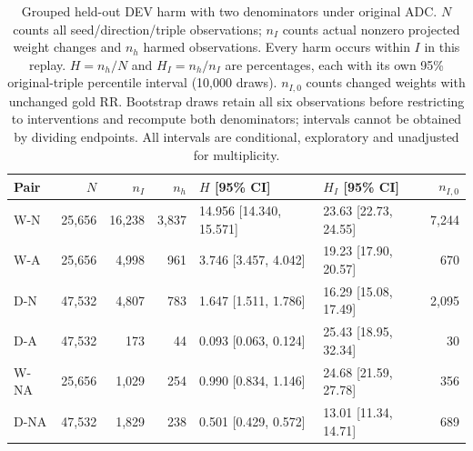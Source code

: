 \begin{table}[htbp]
\centering\footnotesize\setlength{\tabcolsep}{3pt}
\caption{Grouped held-out DEV harm with two denominators under original ADC. $N$ counts all seed/direction/triple observations; $n_I$ counts actual nonzero projected weight changes and $n_h$ harmed observations. Every harm occurs within $I$ in this replay. $H=n_h/N$ and $H_I=n_h/n_I$ are percentages, each with its own 95\% original-triple percentile interval (10,000 draws). $n_{I,0}$ counts changed weights with unchanged gold RR. Bootstrap draws retain all six observations before restricting to interventions and recompute both denominators; intervals cannot be obtained by dividing endpoints. All intervals are conditional, exploratory and unadjusted for multiplicity.}
\label{tab:outcome-harm-dev_oof}
\begin{tabular}{lrrrllr}
\toprule
Pair & $N$ & $n_I$ & $n_h$ & $H$ [95\% CI] & $H_I$ [95\% CI] & $n_{I,0}$\\
\midrule
W-N & 25,656 & 16,238 & 3,837 & 14.956 [14.340, 15.571] & 23.63 [22.73, 24.55] & 7,244\\
W-A & 25,656 & 4,998 & 961 & 3.746 [3.457, 4.042] & 19.23 [17.90, 20.57] & 670\\
D-N & 47,532 & 4,807 & 783 & 1.647 [1.511, 1.786] & 16.29 [15.08, 17.49] & 2,095\\
D-A & 47,532 & 173 & 44 & 0.093 [0.063, 0.124] & 25.43 [18.95, 32.34] & 30\\
W-NA & 25,656 & 1,029 & 254 & 0.990 [0.834, 1.146] & 24.68 [21.59, 27.78] & 356\\
D-NA & 47,532 & 1,829 & 238 & 0.501 [0.429, 0.572] & 13.01 [11.34, 14.71] & 689\\
\bottomrule
\end{tabular}
\end{table}
